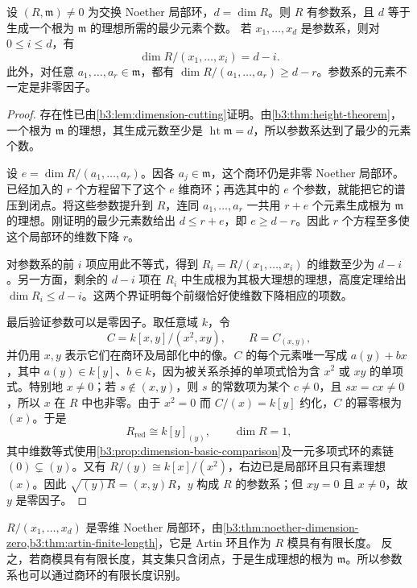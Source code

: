 \begin{theorem}\label{b3:thm:system-of-parameters}
	设 \((R,\mathfrak m)\ne0\) 为交换 Noether 局部环，\(d=\dim R\)。则 \(R\) 有参数系，且 \(d\) 等于生成一个根为 \(\mathfrak m\) 的理想所需的最少元素个数。 若 \(x_1,\ldots,x_d\) 是参数系，则对 \(0\le i\le d\)，有
	\[
		\dim R/(x_1,\ldots,x_i)=d-i.
	\]
	此外，对任意 \(a_1,\ldots,a_r\in\mathfrak m\)，都有 \(\dim R/(a_1,\ldots,a_r)\ge d-r\)。参数系的元素不一定是非零因子。
\end{theorem}
\begin{proof}
	存在性已由\cref{b3:lem:dimension-cutting}证明。由\cref{b3:thm:height-theorem}，一个根为 \(\mathfrak m\) 的理想，其生成元数至少是 \(\operatorname{ht}\mathfrak m=d\)，所以参数系达到了最少的元素个数。

	设 \(e=\dim R/(a_1,\ldots,a_r)\)。因各 \(a_j\in\mathfrak m\)，这个商环仍是非零 Noether 局部环。已经加入的 \(r\) 个方程留下了这个 \(e\) 维商环；再选其中的 \(e\) 个参数，就能把它的谱压到闭点。将这些参数提升到 \(R\)，连同 \(a_1,\ldots,a_r\) 一共用 \(r+e\) 个元素生成根为 \(\mathfrak m\) 的理想。刚证明的最少元素数给出 \(d\le r+e\)，即 \(e\ge d-r\)。因此 \(r\) 个方程至多使这个局部环的维数下降 \(r\)。

	对参数系的前 \(i\) 项应用此不等式，得到 \(R_i=R/(x_1,\ldots,x_i)\) 的维数至少为 \(d-i\)。另一方面，剩余的 \(d-i\) 项在 \(R_i\) 中生成根为其极大理想的理想，高度定理给出 \(\dim R_i\le d-i\)。这两个界证明每个前缀恰好使维数下降相应的项数。

	最后验证参数可以是零因子。取任意域 \(k\)，令
	\[
		C=k[x,y]/(x^2,xy),\qquad R=C_{(x,y)},
	\]
	并仍用 \(x,y\) 表示它们在商环及局部化中的像。\(C\) 的每个元素唯一写成 \(a(y)+bx\)，其中 \(a(y)\in k[y]\)、\(b\in k\)，因为被关系杀掉的单项式恰为含 \(x^2\) 或 \(xy\) 的单项式。特别地 \(x\ne0\)；若 \(s\notin(x,y)\)，则 \(s\) 的常数项为某个 \(c\ne0\)，且 \(sx=cx\ne0\)，所以 \(x\) 在 \(R\) 中也非零。由于 \(x^2=0\) 而 \(C/(x)=k[y]\) 约化，\(C\) 的幂零根为 \((x)\)。于是
	\[
		R_{\mathrm{red}}\cong k[y]_{(y)},\qquad \dim R=1,
	\]
	其中维数等式使用\cref{b3:prop:dimension-basic-comparison}及一元多项式环的素链 \((0)\subsetneq(y)\)。又有 \(R/(y)\cong k[x]/(x^2)\)，右边已是局部环且只有素理想 \((x)\)。因此 \(\sqrt{(y)R}=(x,y)R\)，\(y\) 构成 \(R\) 的参数系；但 \(xy=0\) 且 \(x\ne0\)，故 \(y\) 是零因子。
\end{proof}

\(R/(x_1,\ldots,x_d)\) 是零维 Noether 局部环，由\cref{b3:thm:noether-dimension-zero,b3:thm:artin-finite-length}，它是 Artin 环且作为 \(R\) 模具有有限长度。 反之，若商模具有有限长度，其支集只含闭点，于是生成理想的根为 \(\mathfrak m\)。所以参数系也可以通过商环的有限长度识别。

